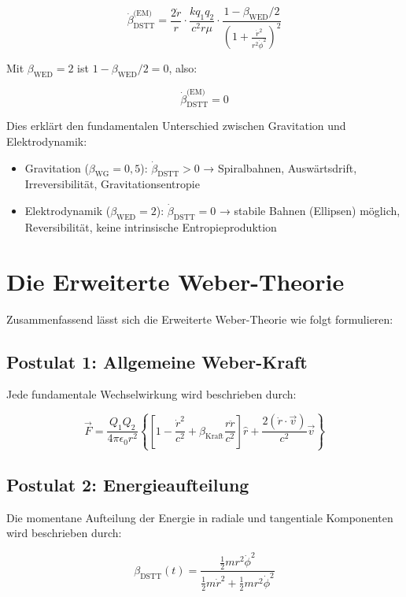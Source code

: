 \[
\dot{\beta}_{\text{DSTT}}^{\text{(EM)}} = \frac{2\dot{r}}{r} \cdot \frac{k q_1 q_2}{c^2 r \mu} \cdot \frac{1 - \beta_{\text{WED}}/2}{\left(1 + \frac{\dot{r}^2}{r^2\dot{\phi}^2}\right)^2}
\]

Mit \(\beta_{\text{WED}} = 2\) ist \(1 - \beta_{\text{WED}}/2 = 0\), also:

\[
\dot{\beta}_{\text{DSTT}}^{\text{(EM)}} = 0
\]

Dies erklärt den fundamentalen Unterschied zwischen Gravitation und Elektrodynamik:

\begin{itemize}
    \item Gravitation (\(\beta_{\text{WG}} = 0,5\)): \(\dot{\beta}_{\text{DSTT}} > 0\) → Spiralbahnen, Auswärtsdrift, Irreversibilität, Gravitationsentropie
    \item Elektrodynamik (\(\beta_{\text{WED}} = 2\)): \(\dot{\beta}_{\text{DSTT}} = 0\) → stabile Bahnen (Ellipsen) möglich, Reversibilität, keine intrinsische Entropieproduktion
\end{itemize}

\section{Die Erweiterte Weber-Theorie}
\label{sec:erweiterte_weber_theorie}

Zusammenfassend lässt sich die Erweiterte Weber-Theorie wie folgt formulieren:

\subsection{Postulat 1: Allgemeine Weber-Kraft}
\label{sub:postulat1}

Jede fundamentale Wechselwirkung wird beschrieben durch:

\[
\vec{F} = \frac{Q_1 Q_2}{4\pi \epsilon_0 r^2} \left\{ \left[ 1 - \frac{\dot{r}^2}{c^2} + \beta_{\text{Kraft}} \frac{r \ddot{r}}{c^2} \right] \hat{r} + \frac{2(\dot{r} \cdot \vec{v})}{c^2} \vec{v} \right\}
\]

\subsection{Postulat 2: Energieaufteilung}
\label{sub:postulat2}

Die momentane Aufteilung der Energie in radiale und tangentiale Komponenten wird beschrieben durch:

\[
\beta_{\text{DSTT}}(t) = \frac{\frac{1}{2}mr^2\dot{\phi}^2}{\frac{1}{2}m\dot{r}^2 + \frac{1}{2}mr^2\dot{\phi}^2}
\]

